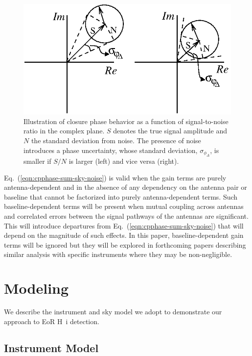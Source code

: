 \documentclass[
reprint,
superscriptaddress,
amsmath,
amssymb,
aps,
prd
]{revtex4-1}
\begin{document}
\begin{figure}[htb]
\includegraphics{phasor}%
\caption{Illustration of closure phase behavior as a function of signal-to-noise ratio in the complex plane. $S$ denotes the true signal amplitude and $N$ the standard deviation from noise. The presence of noise introduces a phase uncertainty, whose standard deviation, $\sigma_{\phi_\Delta}$, is smaller if $S/N$ is larger (left) and vice versa (right). \label{fig:cpphase-cartoon}}
\end{figure}

Eq.~(\ref{eqn:cpphase-sum-sky-noise}) is valid when the gain terms are purely antenna-dependent and in the absence of any dependency on the antenna pair or baseline that cannot be factorized into purely antenna-dependent terms. Such baseline-dependent terms will be present when mutual coupling across antennas and correlated errors between the signal pathways of the antennas are significant. This will introduce departures from Eq.~(\ref{eqn:cpphase-sum-sky-noise}) that will depend on the magnitude of such effects. In this paper, baseline-dependent gain terms will be ignored but they will be explored in forthcoming papers describing similar analysis with specific instruments where they may be non-negligible. 

\section{Modeling}\label{sec:modeling}

We describe the instrument and sky model we adopt to demonstrate our approach to EoR H~{\sc i} detection. 

\subsection{Instrument Model}\label{sec:instrument}
\end{document}
